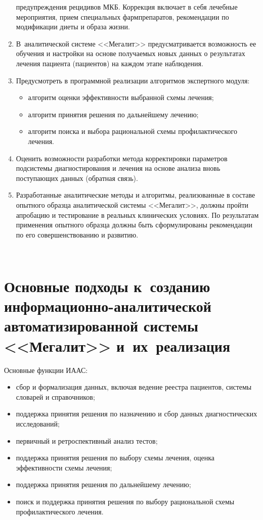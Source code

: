 \begin{multicols}{2}
\begin{enumerate}[1.]
предупреждения рецидивов МКБ. Коррекция включает в себя лечебные мероприятия, прием 
специальных фармпрепаратов, рекомендации по модификации диеты и образа жизни.
\item В~аналитической системе <<Мегалит>> пред\-усмат\-ри\-ва\-ет\-ся возможность ее обучения и 
настройки на основе получаемых новых данных о результатах лечения пациента (пациентов) 
на \mbox{каждом} этапе наблюдения.
\item Предусмотреть в программной реализации алгоритмов экспертного модуля: 
\begin{itemize}
\item
алгоритм оценки эффективности выбранной схемы лечения;
\item
алгоритм принятия решения по дальнейшему лечению;
\item
алгоритм поиска и выбора рациональной схемы профилактического лечения.
\end{itemize}
\item Оценить возможности разработки метода корректировки параметров подсистемы 
диагностирования и лечения на основе анализа вновь поступающих данных (обратная связь).
\item Разработанные аналитические методы и алгоритмы, реализованные в составе опытного 
образца аналитической системы <<Мегалит>>, должны пройти апробацию и тестирование в 
реальных клинических условиях. По результатам применения опытного образца должны быть 
сформулированы рекомендации по его совершенствованию и развитию.
\end{enumerate}

\begin{figure*} %
   \vspace*{1pt}
 \begin{center}
 \mbox{%
 \epsfxsize=143.69mm
 }
 \end{center}
 \vspace*{-6pt}
\end{figure*}

\section{Основные подходы к~созданию информационно-аналитической
автоматизированной системы <<Мегалит>> и~их~реализация}
      Основные функции ИААС:
      \begin{itemize}
\item сбор и формализация данных, включая ведение реестра пациентов, системы словарей и 
справочников;
\item поддержка принятия решения по назначению и сбор данных диагностических 
исследований;
\item первичный и ретроспективный анализ тестов;
\item поддержка принятия решения по выбору схемы лечения, оценка эффективности схемы 
лечения;
\item поддержка принятия решения по дальнейшему лечению;
\item поиск и поддержка принятия решения по выбору рациональной схемы 
профилактического лечения.
\end{itemize}


\end{multicols}

